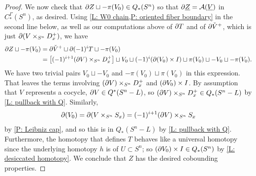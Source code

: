 \begin{proof}

	We now check that $\partial Z \sqcup -\pi(V_0) \in Q_*(S^n)$ so that $\partial \underline{Z} = \mathcal{A}(\underline{V})$ in $C_*^\Gamma(S^n)$, as desired.
	Using \cref{L: W0 chain,P: oriented fiber boundary} in the second line below, as well as our computations above of $\partial T$ and of $\partial \check V^+$, which is just $\partial (V \times_{S^n} D^+_x)$, we have
	\begin{align*}
		\partial Z \sqcup -\pi(V_0) & = \partial \check V^+ \sqcup \partial (-1)^i T \sqcup -\pi(V_0)\\
		&=\left[(-1)^{i+1} (\partial V) \times_{S^n} D_x^+\right] \sqcup V_0 \sqcup
		(-1)^i(\partial (V_0) \times I) \sqcup \pi(V_0)\sqcup -V_0
		\sqcup -\pi(V_0).
	\end{align*}
	We have two trivial pairs $V_0 \sqcup - V_0$ and $ -\pi(V_0) \sqcup \pi(V_0)$ in this expression.
	That leaves the terms involving $(\partial V) \times_{S^n} D_x^+$ and $(\partial V_0) \times I$.
	By assumption that $V$ represents a cocycle, $\partial V \in Q^*(S^n-L)$, so $(\partial V) \times_{S^n} D_x^+ \in Q_*(S^n-L)$ by \cref{L: pullback with Q}.
	Similarly, $$\partial (V_0) = \partial (V \times_{S^n} S_x) = (-1)^{i+1}(\partial V) \times_{S^n} S_x$$ by \cref{P: Leibniz cap}, and so this is in $Q_*(S^n-L)$ by \cref{L: pullback with Q}.
	Furthermore, the homotopy that defines $T$ behaves like a universal homotopy since the underlying homotopy $h$ is of $U \subset S^n$; so $(\partial V_0) \times I \in Q_*(S^n)$ by \cref{L: desiccated homotopy}.
	We conclude that $Z$ has the desired cobounding properties.


\end{proof}
